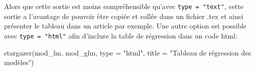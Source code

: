 \documentclass[
  letterpaper,
  DIV=11,
  numbers=noendperiod]{scrreprt}
\newenvironment{Shaded}{\begin{snugshade}}{\end{snugshade}}
\newcommand{\AttributeTok}[1]{\textcolor[rgb]{0.40,0.45,0.13}{#1}}
\newcommand{\FunctionTok}[1]{\textcolor[rgb]{0.28,0.35,0.67}{#1}}
\newcommand{\NormalTok}[1]{\textcolor[rgb]{0.00,0.23,0.31}{#1}}
\newcommand{\StringTok}[1]{\textcolor[rgb]{0.13,0.47,0.30}{#1}}
\begin{document}
Alors que cette sortie est moins compréhensible qu'avec
\texttt{type\ =\ "text"}, cette sortie a l'avantage de pouvoir être
copiée et collée dans un fichier .tex et ainsi présenter le tableau dans
un article par exemple. Une autre option est possible avec
\texttt{type\ =\ "html"} afin d'inclure la table de régression dans un
code html:

\begin{Shaded}
\begin{Highlighting}[]
\FunctionTok{stargazer}\NormalTok{(mod\_lm, mod\_glm, }\AttributeTok{type =} \StringTok{"html"}\NormalTok{, }\AttributeTok{title =} \StringTok{"Tableau de régression des modèles"}\NormalTok{)}
\end{Highlighting}
\end{Shaded}

\begin{verbatim}


\end{verbatim}
\end{document}
